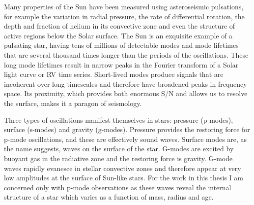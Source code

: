 Many properties of the Sun have been measured using asteroseismic pulsations,
for example the variation in radial pressure, the rate of differential
rotation, the depth and fraction of helium in its convective zone and even the
structure of active regions below the Solar surface.
The Sun is an exquisite example of a pulsating star, having tens of millions
of detectable modes and mode lifetimes that are several thousand times longer
than the periods of the oscillations.
These long mode lifetimes result in narrow peaks in the Fourier transform of a
Solar light curve or RV time series.
Short-lived modes produce signals that are incoherent over long timescales and
therefore have broadened peaks in frequency space.
Its proximity, which provides both enormous S/N and allows us to resolve the
surface, makes it a paragon of seismology.

Three types of oscillations manifest themselves in stars: pressure (p-modes),
surface (s-modes) and gravity (g-modes).
Pressure provides the restoring force for p-mode oscillations, and these are
effectively sound waves.
Surface modes are, as the name suggests, waves on the surface of the star.
G-modes are excited by buoyant gas in the radiative zone and the restoring
force is gravity.
G-mode waves rapidly evanesce in stellar convective zones and therefore
appear at very low amplitudes at the surface of Sun-like stars.
For the work in this thesis I am concerned only with p-mode observations as
these waves reveal the internal structure of a star which varies as a function
of mass, radius and age.

